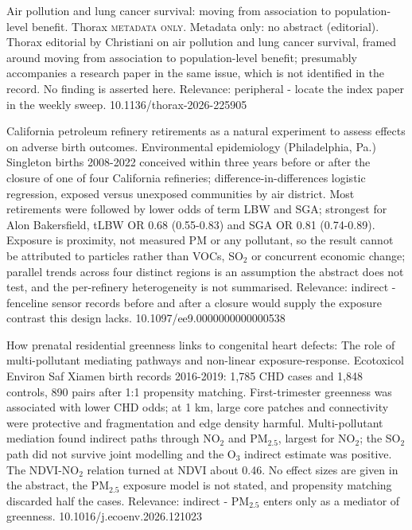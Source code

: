 \documentclass[10pt]{article}
\begin{document}
{Air pollution and lung cancer survival: moving from association to population-level benefit.}
{Thorax}
{\textsc{metadata only.} Metadata only: no abstract (editorial). Thorax editorial by Christiani on air pollution and lung cancer survival, framed around moving from association to population-level benefit; presumably accompanies a research paper in the same issue, which is not identified in the record. No finding is asserted here. Relevance: peripheral - locate the index paper in the weekly sweep.}
{10.1136/thorax-2026-225905}

\par{}\baselineskip{}\baselineskip
{}

{California petroleum refinery retirements as a natural experiment to assess effects on adverse birth outcomes.}
{Environmental epidemiology (Philadelphia, Pa.)}
{Singleton births 2008-2022 conceived within three years before or after the closure of one of four California refineries; difference-in-differences logistic regression, exposed versus unexposed communities by air district. Most retirements were followed by lower odds of term LBW and SGA; strongest for Alon Bakersfield, tLBW OR 0.68 (0.55-0.83) and SGA OR 0.81 (0.74-0.89). Exposure is proximity, not measured PM or any pollutant, so the result cannot be attributed to particles rather than VOCs, SO$_2$ or concurrent economic change; parallel trends across four distinct regions is an assumption the abstract does not test, and the per-refinery heterogeneity is not summarised. Relevance: indirect - fenceline sensor records before and after a closure would supply the exposure contrast this design lacks.}
{10.1097/ee9.0000000000000538}

{How prenatal residential greenness links to congenital heart defects: The role of multi-pollutant mediating pathways and non-linear exposure-response.}
{Ecotoxicol Environ Saf}
{Xiamen birth records 2016-2019: 1,785 CHD cases and 1,848 controls, 890 pairs after 1:1 propensity matching. First-trimester greenness was associated with lower CHD odds; at 1 km, large core patches and connectivity were protective and fragmentation and edge density harmful. Multi-pollutant mediation found indirect paths through NO$_2$ and PM$_{2.5}$, largest for NO$_2$; the SO$_2$ path did not survive joint modelling and the O$_3$ indirect estimate was positive. The NDVI-NO$_2$ relation turned at NDVI about 0.46. No effect sizes are given in the abstract, the PM$_{2.5}$ exposure model is not stated, and propensity matching discarded half the cases. Relevance: indirect - PM$_{2.5}$ enters only as a mediator of greenness.}
{10.1016/j.ecoenv.2026.121023}
\end{document}
